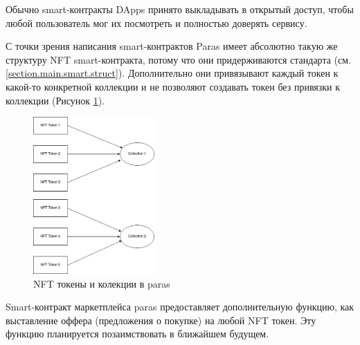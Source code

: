\begin{remark}
    Обычно smart-контракты DApps принято выкладывать в открытый доступ, чтобы любой пользователь мог их посмотреть и полностью доверять сервису.
\end{remark}

С точки зрения написания smart-контрактов Paras имеет абсолютно такую же структуру NFT smart-контракта, потому что они придерживаются стандарта \cite{nftstandart} (см. {\color{blue} \ref{section.main.smart.struct}}).
Дополнительно они привязывают каждый токен к какой-то конкретной коллекции и не позволяют создавать токен без привязки к коллекции (Рисунок {\color{blue} \ref{fig.parascollections}}).

\begin{figure}
	\centering
	\includegraphics[height=60mm]{fig/parascollections.png}
	\caption{NFT токены и колекции в paras}
    \label{fig.parascollections}
\end{figure}

Smart-контракт маркетплейса paras предоставляет дополнительную функцию, как выставление оффера (предложения о покупке) на любой NFT токен. Эту функцию планируется позаимствовать в ближайшем будущем.


